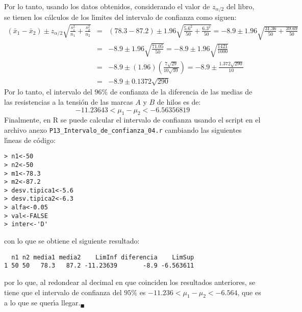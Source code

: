 \begin{solucion}
\begin{equation*}
 \end{equation*}
 Por lo tanto, usando los datos obtenidos, considerando el valor de $z_{\alpha/2}$ del libro, se tienen los c\'alculos de los l\'{\i}mites del intervalo de confianza como siguen:
 \begin{eqnarray*}
  \left( \bar{x}_1 - \bar{x}_2 \right) \pm z_{\alpha/2}\sqrt{\frac{s_1^2}{n_1} + \frac{s_2^2}{n_2}} & = & (78.3 - 87.2) \pm 1.96\sqrt{\frac{5.6^2}{50} + \frac{6.3^2}{50}} = -8.9 \pm 1.96\sqrt{\frac{31.36}{50} + \frac{39.69}{50}} \\ 
  & = & -8.9 \pm 1.96\sqrt{\frac{71.05}{50}} = -8.9 \pm 1.96\sqrt{\frac{1421}{1000}} \\
  & = & -8.9 \pm (1.96)\left( \frac{7\sqrt{29}}{10\sqrt{10}} \right) = -8.9 \pm \frac{1.372\sqrt{290}}{10} \\
  & = & -8.9 \pm 0.1372\sqrt{290}
 \end{eqnarray*}
 Por lo tanto, el intervalo del $96\%$ de confianza de la diferencia de las medias de las resistencias a la tensi\'on de las marcas $A$ y $B$ de hilos es de:
 \begin{equation*}
  -11.23643 < \mu_1 - \mu_2 < -6.56356819
 \end{equation*}
 Finalmente, en R se puede calcular el intervalo de confianza usando el script en el archivo anexo \texttt{P13\_Intervalo\_de\_confianza\_04.r} cambiando las siguientes l\'{\i}neas de c\'odigo:
 \begin{verbatim}
> n1<-50
> n2<-50
> m1<-78.3
> m2<-87.2
> desv.tipica1<-5.6
> desv.tipica2<-6.3
> alfa<-0.05
> val<-FALSE
> inter<-'D'
 \end{verbatim}
 \vspace{-0.5cm}
 con lo que se obtiene el siguiente resultado:
 \begin{verbatim}
  n1 n2 media1 media2    LimInf diferencia    LimSup
1 50 50   78.3   87.2 -11.23639       -8.9 -6.563611
 \end{verbatim}
 \vspace{-0.5cm}
 por lo que, al redondear al decimal en que coinciden los resultados anteriores, se tiene que el intervalo de confianza del $95\%$ es $-11.236 < \mu_1 - \mu_2 < -6.564$, que es a lo que se quer\'{\i}a llegar.${}_{\blacksquare}$
\end{solucion}
